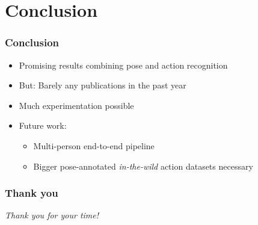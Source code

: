 \documentclass[9pt]{beamer}
\newenvironment{myframe}[1][]{%
\begin{frame}%
\frametitle{#1}
\setcounter{footnote}{0}


}{%
\end{frame}%
}
\begin{document}
\section{Conclusion}
\begin{myframe}[Conclusion]
    \begin{itemize}
        \item Promising results combining pose and action recognition
        \item But: Barely any publications in the past year
        \item Much experimentation possible
        \item Future work:
        \begin{itemize}
            \item Multi-person end-to-end pipeline
            \item Bigger pose-annotated \emph{in-the-wild} action datasets necessary
        \end{itemize}
    \end{itemize}
\end{myframe}

\begin{myframe}[Thank you]
    \centering \Large
    \emph{Thank you for your time!}
\end{myframe}
\end{document}

